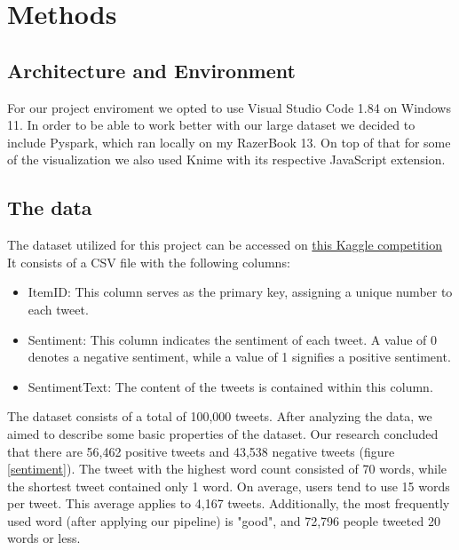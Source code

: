 \documentclass[11pt,a4paper]{article}
\begin{document}
\section{Methods}
\subsection{Architecture and Environment}
For our project enviroment we opted to use Visual Studio Code 1.84 on Windows 11. In order to be able to work better with our large dataset we decided to include Pyspark, which ran locally on my RazerBook 13. On top of that for some of the visualization we also used Knime with its respective JavaScript extension.
\subsection{The data}
The dataset utilized for this project can be accessed on \href{https://www.kaggle.com/competitions/twitter-sentiment-analysis2}{this Kaggle competition} 
It consists of a CSV file with the following columns:
\begin{itemize}
\item ItemID: This column serves as the primary key, assigning a unique number to each tweet.
\item Sentiment: This column indicates the sentiment of each tweet. A value of 0 denotes a negative sentiment, while a value of 1 signifies a positive sentiment.
\item SentimentText: The content of the tweets is contained within this column.
\end{itemize}
The dataset consists of a total of 100,000 tweets. After analyzing the data, we aimed to describe some basic properties of the dataset. Our research concluded that there are 56,462 positive tweets and 43,538 negative tweets (figure \ref{sentiment}). The tweet with the highest word count consisted of 70 words, while the shortest tweet contained only 1 word. On average, users tend to use 15 words per tweet. This average applies to 4,167 tweets. Additionally, the most frequently used word (after applying our pipeline) is "good", and 72,796 people tweeted 20 words or less.
\end{document}
